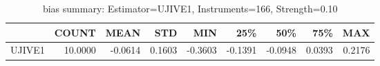 \begin{table}[ht]
\centering
\caption{bias summary: Estimator=UJIVE1, Instruments=166, Strength=0.10}
\begin{tabular}{lrrrrrrrr}
\toprule
 & COUNT & MEAN & STD & MIN & 25\% & 50\% & 75\% & MAX \\
\midrule
UJIVE1 & 10.0000 & -0.0614 & 0.1603 & -0.3603 & -0.1391 & -0.0948 & 0.0393 & 0.2176 \\
\bottomrule
\end{tabular}
\end{table}
